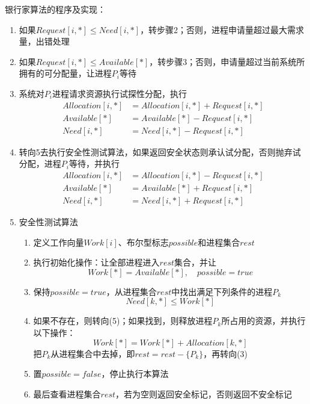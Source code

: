 \documentclass[cs4size,a4paper,10pt]{ctexart}
\begin{document}
	银行家算法的程序及实现：
	\begin{enumerate}[label=\arabic*.]
		\item 如果$Request[i, *]\leq Need[i, *]$，转步骤2；否则，进程申请量超过最大需求量，出错处理
		\item 如果$Request[i, *]\leq Available[*]$，转步骤3；否则，申请量超过当前系统所拥有的可分配量，让进程$P_i$等待
		\item 系统对$P_i$进程请求资源执行试探性分配，执行
		$$\begin{aligned}
			Allocation[i,*] & = Allocation[i,*] + Request[i,*] \\
			Available[*] & = Available[*] - Request[i,*] \\
			Need[i,*] & = Need[i,*] - Request[i,*] 
		\end{aligned}$$
		\item 转向5去执行安全性测试算法，如果返回安全状态则承认试分配，否则抛弃试分配，进程$P_i$等待，并执行		
		$$\begin{aligned}
			Allocation[i,*] & = Allocation[i,*] - Request[i,*] \\
			Available[*] & = Available[*] + Request[i,*] \\
			Need[i,*] & = Need[i,*] + Request[i,*] 
		\end{aligned}$$
		\item 安全性测试算法
		\begin{enumerate}[label=(\arabic*)]
			\item 定义工作向量$Work[i]$、布尔型标志$possible$和进程集合$rest$
			\item 执行初始化操作：让全部进程进入$rest$集合，并让
			$$Work[*] = Available[*],\quad possible = true$$
			\item 保持$possible=true$，从进程集合$rest$中找出满足下列条件的进程$P_k$
			$$Need[k,*]\leq Work[*]$$
			\item 如果不存在，则转向(5)；如果找到，则释放进程$P_k$所占用的资源，并执行以下操作：
			$$Work[*] = Work[*] + Allocation[k,*]$$
			把$P_k$从进程集合中去掉，即$rest = rest - \{P_k\}$，再转向(3)
			\item 置$possible = false$，停止执行本算法
			\item 最后查看进程集合$rest$，若为空则返回安全标记，否则返回不安全标记
		\end{enumerate}
	\end{enumerate}
\end{document}

